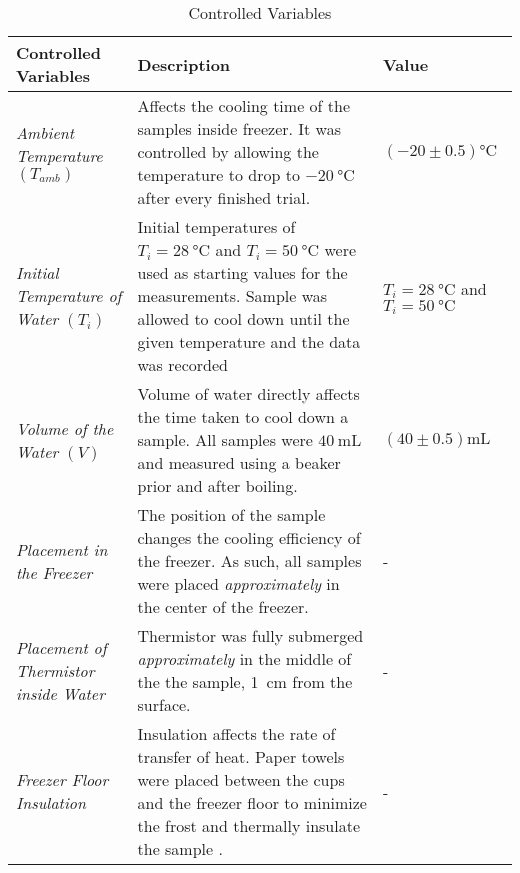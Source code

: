 \documentclass[../main.tex]{subfiles}
\begin{document}
\begin{table}[H]
\setlength\extrarowheight{5pt}
    \centering
    \begin{tabular}[H]{|M{5cm}|M{5cm}|M{5cm}|}
    \hline
    \textbf{Controlled Variables}   &   \textbf{Description}   & \textbf{Value}\\[5pt] \hline %
    \textit{Ambient Temperature} \newline $(T_{amb})$ & Affects the cooling time of the samples inside freezer. It was controlled by allowing the temperature to drop to $\SI{-20}{\celsius}$ after every finished trial. & $(-20 \pm 0.5)\si{\celsius}$ \\[5pt] \hline
    \textit{Initial Temperature \break of Water} \break $(T_{i})$ & Initial temperatures of $T_i = \SI{28}{\celsius}$ and $T_i = \SI{50}{\celsius}$ were used as starting values for the measurements. Sample was allowed to cool down until the given temperature and the data was recorded & $T_i = \SI{28}{\celsius}$ and $T_i = \SI{50}{\celsius}$ \\[10pt]\hline
    \textit{Volume of the Water} \newline $(V)$ & Volume of water directly affects the time taken to cool down a sample. All samples were $\SI{40}{\milli\liter}$ and measured using a beaker prior and after boiling. & $(40 \pm 0.5) \si{\milli\liter}$ \\[5pt]\hline
    \textit{Placement in the Freezer} & The position of the sample changes the cooling efficiency of the freezer. As such, all samples were placed \textit{approximately} in the center of the freezer. & - \\[4pt]\hline
    \textit{Placement of Thermistor inside  Water} & Thermistor was fully submerged \emph{approximately} in the middle of the the sample, \SI{1}{\centi\meter} from the surface.& - \\[5pt]\hline
    \textit{Freezer Floor Insulation} & Insulation affects the rate of transfer of heat. Paper towels were placed between the cups and the freezer floor to minimize the frost and thermally insulate the sample .& - \\[5pt]\hline
    \end{tabular}
    \caption{Controlled Variables}
    \label{tab:controlledVariables}
\end{table}
\end{document}
